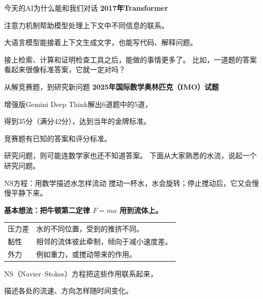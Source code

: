 \documentclass[aspectratio=169,10pt]{beamer}
\newcommand{\key}[1]{{\color{campusgreen}\bfseries #1}}
\begin{document}
\begin{frame}[t]{今天的AI为什么能和我们对话}
  \key{2017年\quad Transformer}
  \par\vspace{3mm}
  注意力机制帮助模型处理上下文中不同信息的联系。
  \par\vspace{7mm}
  大语言模型能接着上下文生成文字，也能写代码、解释问题。
  \par\vspace{7mm}
  接上检索、计算和证明检查工具之后，能做的事情更多了。
  \vfill
  比如，一道题的答案看起来很像标准答案，它就一定对吗？
\end{frame}


\begin{frame}[t]{从解竞赛题，到研究新问题}
  \key{2025年\quad 国际数学奥林匹克（IMO）试题}
  \par\vspace{8mm}
  增强版Gemini Deep Think解出6道题中的5道，\par
  得到35分（满分42分），达到当年的金牌标准。
  \par\vspace{10mm}
  竞赛题有已知的答案和评分标准。\par
  研究问题，则可能连数学家也还不知道答案。
  \vfill
  下面从大家熟悉的水流，说起一个研究问题。
\end{frame}

\begin{frame}[t,label=nsintro]{NS方程：用数学描述水怎样流动}
  搅动一杯水，水会旋转；停止搅动后，它又会慢慢平静下来。
  \par\vspace{6mm}
  \key{基本想法：把牛顿第二定律 $F=ma$ 用到流体上。}
  \par\vspace{5mm}
  \begin{tabular}{@{}lp{113mm}@{}}
    压力差 & 水的不同位置，受到的推挤不同。\\[4mm]
    黏性 & 相邻的流体彼此牵制，倾向于减小速度差。\\[4mm]
    外力 & 例如重力，或搅动带来的作用。\\
  \end{tabular}
  \vfill
  NS（Navier--Stokes）方程把这些作用联系起来，\par
  描述各处的流速、方向怎样随时间变化。
\end{frame}
\end{document}
